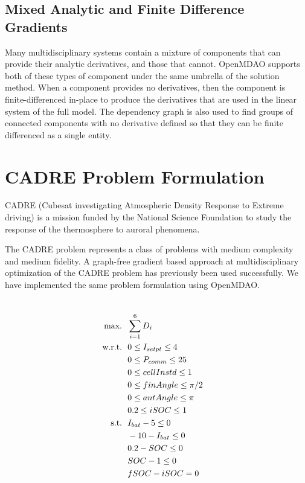 \documentclass[]{aiaa-tc} %
\newcommand{\txt}{\textrm}
\begin{document}
    \subsection{Mixed Analytic and Finite Difference Gradients}

    Many multidisciplinary systems contain a mixture of components that can provide their analytic derivatives, and
    those that cannot. OpenMDAO supports both of these types of component under the same umbrella of the
    solution method. When a component provides no derivatives, then the component is finite-differenced in-place to
    produce the derivatives that are used in the linear system of the full model. The dependency graph is also used
    to find groups of connected components with no derivative defined so that they can be finite differenced as a single entity.

  \section{CADRE Problem Formulation}

  CADRE (Cubesat investigating Atmospheric Density Response to Extreme driving)
  is a mission funded by the National Science Foundation to study the
  response of the thermosphere to auroral phenomena\cite{cutler2011cubesat}.

  The CADRE problem represents a class of problems with medium complexity and medium fidelity.
  A graph-free gradient based approach at multidisciplinary optimization of the CADRE
  problem has previously been used successfully\cite{CADRE2012}. We have implemented
  the same problem formulation using OpenMDAO.

    \begin{align}
        \\\txt{max.} &\ \ \sum_{i=1}^6 D_i \notag
        \\\txt{w.r.t.} & \ \ 0 \le I_{setpt} \le 4 \notag
        \\     & \ \ 0 \le P_{comm} \le 25 \notag
        \\     & \ \ 0 \le cellInstd \le 1 \notag
        \\     & \ \ 0 \le finAngle \le \pi/2 \notag
        \\     & \ \ 0 \le antAngle \le \pi \notag
        \\     & \ \ 0.2 \le iSOC \le 1 \notag
        \\\txt{s.t.} & \ \ I_{bat} - 5 \le 0 \notag
        \\     & \ \ -10 - I_{bat} \le 0 \notag
        \\     & \ \ 0.2 - SOC \le 0 \notag
        \\     & \ \ SOC - 1 \le 0 \notag
        \\     & \ \ fSOC - iSOC = 0 \notag
        \label{eqn:sellar_formulation}
    \end{align}
\end{document}
